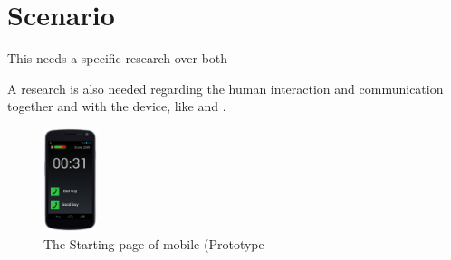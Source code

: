 \documentclass[conference]{IEEEtran}
\begin{document}
\section{Scenario}
\cite{scenario}

This needs a specific research over both 


A research is also needed regarding the human interaction and communication
together and with the device, like \cite{behavior} and \cite{facial-vocal}.

\cite{scenario-adapt}
\cite{scenario-repurposing}


\cite{scenario-gen}
\cite{l-system}

\begin{figure}
 \centering
\includegraphics[width=0.14\textwidth]{kar}
\caption{The Starting page of mobile (Prototype}
\label{diagram}
\end{figure}




\end{document}
